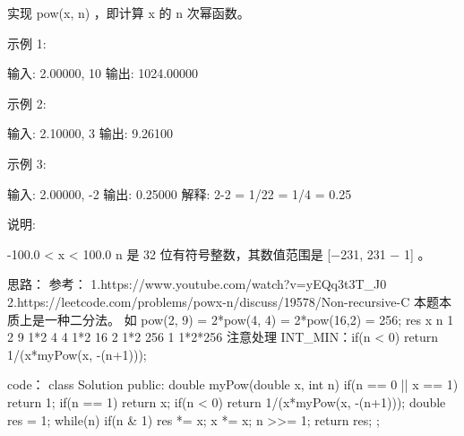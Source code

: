 实现 pow(x, n) ，即计算 x 的 n 次幂函数。

示例 1:

输入: 2.00000, 10
输出: 1024.00000

示例 2:

输入: 2.10000, 3
输出: 9.26100

示例 3:

输入: 2.00000, -2
输出: 0.25000
解释: 2-2 = 1/22 = 1/4 = 0.25

说明:

    -100.0 < x < 100.0
    n 是 32 位有符号整数，其数值范围是 [−231, 231 − 1] 。
























思路：
参考：
1.https://www.youtube.com/watch?v=yEQq3t3T_J0
2.https://leetcode.com/problems/powx-n/discuss/19578/Non-recursive-C%
本题本质上是一种二分法。
如 pow(2, 9) = 2*pow(4, 4) = 2*pow(16,2) = 256;
res		 x 		n 
1 		 2  		9
1*2  		 4   		4
1*2  		 16		2
1*2 		 256  	1
1*2*256
注意处理 INT_MIN：if(n < 0) return 1/(x*myPow(x, -(n+1)));


























code：
class Solution {
public:
    double myPow(double x, int n) {
        if(n == 0 || x == 1) return 1;
        if(n == 1) return x;
        if(n < 0) return 1/(x*myPow(x, -(n+1)));
        double res = 1;
        while(n)
        {
            if(n & 1) res *= x;
            x *= x;
            n >>= 1;
        }
        return res;
    }
};
